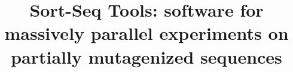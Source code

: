 \documentclass{bmcart}
\begin{document}
\begin{frontmatter}

\begin{fmbox}


\title{Sort-Seq Tools: software for massively parallel experiments on partially mutagenized sequences}



\author[
   addressref={aff1},                   %
   email={wireland@caltech.edu}   %
]{ }
\author[
   addressref={aff2},
   email={phillips@pboc.caltech.edu}
]{ }
\author[
   addressref={aff3},                   %
   corref={aff3},                       %
   email={jkinney@cshl.edu}   %
]{ }



\address[id=aff1]{%
  , %
  ,                                %
  ,                              %
}
\address[id=aff2]{%
  , 
  ,                               
  ,                        
}
\address[id=aff3]{%
  ,
  ,
  ,
}


\end{fmbox}
\end{frontmatter}
\end{document}
